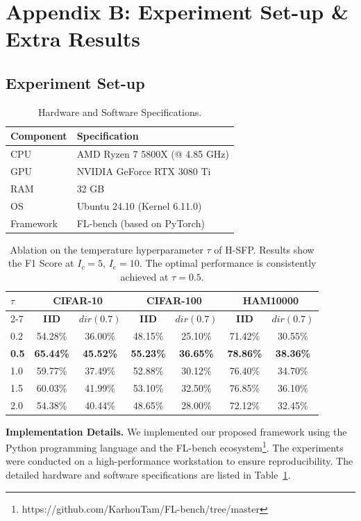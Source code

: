 \section*{Appendix B: Experiment Set-up \& Extra Results}
\subsection*{Experiment Set-up}
\begin{table}[h]
    \centering
    \caption{Hardware and Software Specifications.}
    \label{tab:system_specs}
    \begin{tabular}{ll}
        \toprule
        \textbf{Component} & \textbf{Specification} \\
        \midrule
        CPU & AMD Ryzen 7 5800X (@ 4.85 GHz) \\
        GPU & NVIDIA GeForce RTX 3080 Ti \\
        RAM & 32 GB \\
        OS & Ubuntu 24.10 (Kernel 6.11.0) \\
        Framework & FL-bench (based on PyTorch) \\
        \bottomrule
    \end{tabular}
\end{table}    
\label{subsec:setup}
\begin{table}
    \caption{Ablation on the temperature hyperparameter $\tau$ of H-SFP. Results show the F1 Score at $I_c=5$, $I_e=10$. The optimal performance is consistently achieved at $\tau=0.5$.}
    \centering
    \begin{tabular}{l|cc|cc|cc}
        \hline
        \multirow{2}{*}{\textbf{$\tau$}} & 
        \multicolumn{2}{c|}{\textbf{CIFAR-10}} &
        \multicolumn{2}{c|}{\textbf{CIFAR-100}} &
        \multicolumn{2}{c}{\textbf{HAM10000}} \\ \cline{2-7}
        & \textbf{IID} & $dir(0.7)$ & \textbf{IID} & $dir(0.7)$ & \textbf{IID} & $dir(0.7)$ \\
        \hline
        0.2 & 54.28\% & 36.00\% & 48.15\% & 25.10\% & 71.42\% & 30.55\% \\
        \textbf{0.5} & \textbf{65.44\%} & \textbf{45.52\%} & \textbf{55.23\%} & \textbf{36.65\%} & \textbf{78.86\%} & \textbf{38.36\%} \\
        1.0 & 59.77\% & 37.49\% & 52.88\% & 30.12\% & 76.40\% & 34.70\% \\
        1.5 & 60.03\% & 41.99\% & 53.10\% & 32.50\% & 76.85\% & 36.10\% \\
        2.0 & 54.38\% & 40.44\% & 48.65\% & 28.00\% & 72.12\% & 32.45\% \\
        \hline
    \end{tabular}
    \label{tab:temp_ablation}
\end{table}
\noindent\textbf{Implementation Details.} 
We implemented our proposed framework using the Python programming language and the FL-bench ecosystem\footnote{https://github.com/KarhouTam/FL-bench/tree/master}. The experiments were conducted on a high-performance workstation to ensure reproducibility. The detailed hardware and software specifications are listed in Table~\ref{tab:system_specs}.

